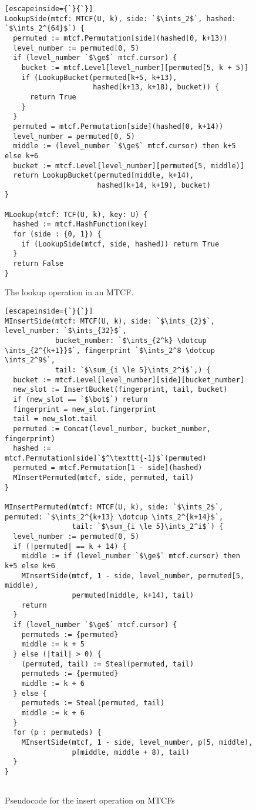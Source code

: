 \documentclass[manuscript,screen,review]{acmart}
\newcommand{\ints}{\mathbb{Z}}
\newcommand{\dotcup}{\ensuremath{\mathaccent\cdot\cup}}
\begin{document}
\begin{figure}[!htbp]

\begin{lstlisting}[escapeinside={`}{`}]
LookupSide(mtcf: MTCF(U, k), side: `$\ints_2$`, hashed: `$\ints_2^{64}$`) {
  permuted := mtcf.Permutation[side](hashed[0, k+13))
  level_number := permuted[0, 5)
  if (level_number `$\ge$` mtcf.cursor) {
    bucket := mtcf.Level[level_number][permuted[5, k + 5)]
    if (LookupBucket(permuted[k+5, k+13),
                     hashed[k+13, k+18), bucket)) {
      return True
    }
  }
  permuted = mtcf.Permutation[side](hashed[0, k+14))
  level_number = permuted[0, 5)
  middle := (level_number `$\ge$` mtcf.cursor) then k+5 else k+6
  bucket := mtcf.Level[level_number][permuted[5, middle)]
  return LookupBucket(permuted[middle, k+14),
                      hashed[k+14, k+19), bucket)
}

MLookup(mtcf: TCF(U, k), key: U) {
  hashed := mtcf.HashFunction(key)
  for (side : {0, 1}) {
    if (LookupSide(mtcf, side, hashed)) return True
  }
  return False
}
\end{lstlisting}
\caption{The lookup operation in an MTCF.}

\end{figure}

\begin{figure}

\begin{lstlisting}[escapeinside={`}{`}]
MInsertSide(mtcf: MTCF(U, k), side: `$\ints_{2}$`, level_number: `$\ints_{32}$`,
            bucket_number: `$\ints_{2^k} \dotcup \ints_{2^{k+1}}$`, fingerprint `$\ints_2^8 \dotcup \ints_2^9$`,
            tail: `$\sum_{i \le 5}\ints_2^i$`,) {
  bucket := mtcf.Level[level_number][side][bucket_number]
  new_slot := InsertBucket(fingerprint, tail, bucket)
  if (new_slot == `$\bot$`) return
  fingerprint = new_slot.fingerprint
  tail = new_slot.tail
  permuted := Concat(level_number, bucket_number, fingerprint)
  hashed := mtcf.Permutation[side]`$^\texttt{-1}$`(permuted)
  permuted = mtcf.Permutation[1 - side](hashed)
  MInsertPermuted(mtcf, side, permuted, tail)
}

MInsertPermuted(mtcf: MTCF(U, k), side: `$\ints_2$`, permuted: `$\ints_2^{k+13} \dotcup \ints_2^{k+14}$`,
                tail: `$\sum_{i \le 5}\ints_2^i$`) {
  level_number := permuted[0, 5)
  if (|permuted| == k + 14) {
    middle := if (level_number `$\ge$` mtcf.cursor) then k+5 else k+6
    MInsertSide(mtcf, 1 - side, level_number, permuted[5, middle),
                permuted[middle, k+14), tail)
    return
  }
  if (level_number `$\ge$` mtcf.cursor) {
    permuteds := {permuted}
    middle := k + 5
  } else (|tail| > 0) {
    (permuted, tail) := Steal(permuted, tail)
    permuteds := {permuted}
    middle := k + 6
  } else {
    permuteds := Steal(permuted, tail)
    middle := k + 6
  }
  for (p : permuteds) {
    MInsertSide(mtcf, 1 - side, level_number, p[5, middle),
                p[middle, middle + 8), tail)
  }
}


\end{lstlisting}
\caption{Pseudocode for the insert operation on MTCFs}

\end{figure}
\end{document}
